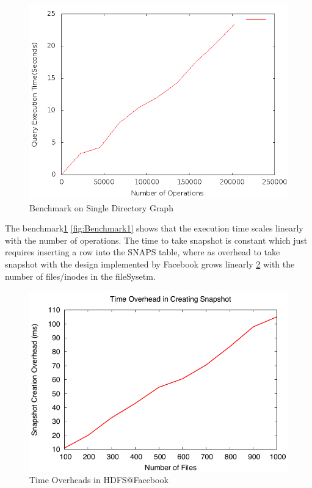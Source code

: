 \begin{figure}
\centering  
 \includegraphics[scale=0.5]{figs/preliminar/benchmark_graph2.png}
  \caption{Benchmark on Single Directory Graph}
  \label{fig:benchmark_graph2}
\end{figure}

The benchmark\ref{fig:benchmark_graph2} \ref{fig:Benchmark1} shows that the execution time scales linearly with the number of operations. The time to take snapshot is constant which just requires inserting a row into the SNAPS table, where as overhead to take snapshot with the design implemented by Facebook \cite{Facebook} grows linearly \ref{fig:Benchmark_facebook} with the number of files/inodes in the fileSysetm.

\begin{figure}
\centering  
 \includegraphics[scale=0.5]{figs/preliminar/Facebook_Snapshots.png}
  \caption{Time Overheads in HDFS@Facebook}
  \label{fig:Benchmark_facebook}
\end{figure}

